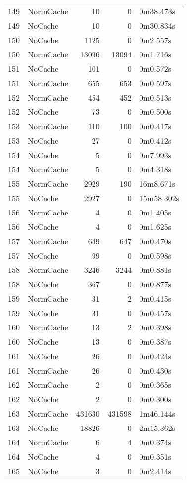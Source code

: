 \begin{tabular}{llrrl}
149 & NormCache & 10 & 0 & 0m38.473s \\
149 & NoCache & 10 & 0 & 0m30.834s \\
150 & NoCache & 1125 & 0 & 0m2.557s \\
150 & NormCache & 13096 & 13094 & 0m1.716s \\
151 & NoCache & 101 & 0 & 0m0.572s \\
151 & NormCache & 655 & 653 & 0m0.597s \\
152 & NormCache & 454 & 452 & 0m0.513s \\
152 & NoCache & 73 & 0 & 0m0.500s \\
153 & NormCache & 110 & 100 & 0m0.417s \\
153 & NoCache & 27 & 0 & 0m0.412s \\
154 & NoCache & 5 & 0 & 0m7.993s \\
154 & NormCache & 5 & 0 & 0m4.318s \\
155 & NormCache & 2929 & 190 & 16m8.671s \\
155 & NoCache & 2927 & 0 & 15m58.302s \\
156 & NormCache & 4 & 0 & 0m1.405s \\
156 & NoCache & 4 & 0 & 0m1.625s \\
157 & NormCache & 649 & 647 & 0m0.470s \\
157 & NoCache & 99 & 0 & 0m0.598s \\
158 & NormCache & 3246 & 3244 & 0m0.881s \\
158 & NoCache & 367 & 0 & 0m0.877s \\
159 & NormCache & 31 & 2 & 0m0.415s \\
159 & NoCache & 31 & 0 & 0m0.457s \\
160 & NormCache & 13 & 2 & 0m0.398s \\
160 & NoCache & 13 & 0 & 0m0.387s \\
161 & NoCache & 26 & 0 & 0m0.424s \\
161 & NormCache & 26 & 0 & 0m0.430s \\
162 & NormCache & 2 & 0 & 0m0.365s \\
162 & NoCache & 2 & 0 & 0m0.300s \\
163 & NormCache & 431630 & 431598 & 1m46.144s \\
163 & NoCache & 18826 & 0 & 2m15.362s \\
164 & NormCache & 6 & 4 & 0m0.374s \\
164 & NoCache & 4 & 0 & 0m0.351s \\
165 & NoCache & 3 & 0 & 0m2.414s \\

\end{tabular}
